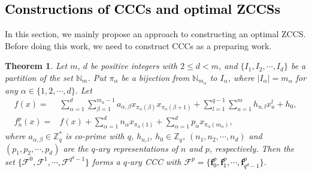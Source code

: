 \documentclass[11pt]{article}
\newcommand{\2} {$2$-to-$1$}
\newtheorem{thm}{\bfseries  Theorem}[section]
\begin{document}
\textcolor{black}{\section{Constructions of CCCs and optimal ZCCSs}}
In this section, we mainly propose an approach to constructing an optimal ZCCS. Before doing this work, we need to construct  CCCs as a preparing work.



\begin{thm}\label{8}
	Let $m$, $ d $ be positive integers with $ 2\leq d<m $, and $\{I_1, I_2,\cdots,I_d\}$ be a partition of the set $\mathbb{N}_m$. Put $ \pi_{\alpha} $ be a bijection from $ \mathbb{N}_{m_{\alpha}}$ to $ I_{\alpha} $, where $ \lvert I_{\alpha}\rvert =m_{\alpha} $ for any $ \alpha\in \{1,2,\cdots,d\}. $ Let
	\begin{align*}
		f(x)=&\sum_{\alpha=1}^{d}\sum_{\beta=1}^{m_{\alpha}-1}a_{\alpha,\beta}x_{\pi_{\alpha}(\beta)}x_{\pi_{\alpha}(\beta+1)}+\sum_{l=1}^{q-1}\sum_{u=1}^{m}h_{u,l}x^l_u+h_0,\\
		f^p_{n}(x)=&f(x)+\sum_{\alpha=1}^{d}n_{\alpha}x_{\pi_{\alpha}(1)}+\sum_{\alpha=1}^{d}p_{\alpha}x_{\pi_{\alpha}(m_{\alpha})},
	\end{align*}
	where $a_{\alpha,\beta} \in \mathbb{Z}^{*}_{q}$ is co-prime with $q$, $h_{u,l}$, $ h_0 \in \mathbb{Z}_{q}$,  $(n_{1},n_{2},\cdots,n_{d})$ and $(p_{1},p_{2},\cdots,p_{d})$ are the $q$-ary representations of $n$ and $ p $, respectively. Then the set \textcolor{black}{$ \{\mathcal{F}^{0},\mathcal{F}^{1},\cdots,\mathcal{F}^{q^d-1}\} $} forms a $q$-ary CCC   with
	\textcolor{black}{$\mathcal{F}^p=\{\mathbf{f}^p_{0},\mathbf{f}^p_{1},\cdots,\mathbf{f}^p_{q^d-1}\}$. }
\end{thm}
\end{document}
